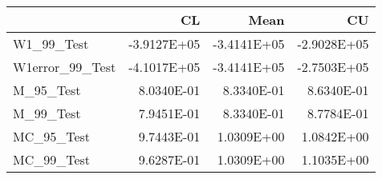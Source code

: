 \begin{tabular}{lrrr}
\toprule
{} &          CL &        Mean &          CU \\
\midrule
W1\_99\_Test      & -3.9127E+05 & -3.4141E+05 & -2.9028E+05 \\
W1error\_99\_Test & -4.1017E+05 & -3.4141E+05 & -2.7503E+05 \\
M\_95\_Test       &  8.0340E-01 &  8.3340E-01 &  8.6340E-01 \\
M\_99\_Test       &  7.9451E-01 &  8.3340E-01 &  8.7784E-01 \\
MC\_95\_Test      &  9.7443E-01 &  1.0309E+00 &  1.0842E+00 \\
MC\_99\_Test      &  9.6287E-01 &  1.0309E+00 &  1.1035E+00 \\
\bottomrule
\end{tabular}
